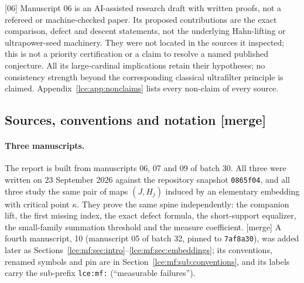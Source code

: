 \documentclass[11pt,letterpaper]{article}
\numberwithin{equation}{section}
\theoremstyle{definition}
\theoremstyle{remark}
\newcommand{\src}[1]{\textup{\textsf{\small[#1]}}}%
\newcommand{\mergetag}{\textup{\textsf{\small[merge]}}}%
\begin{document}
\src{06} Manuscript 06 is an AI-assisted research draft with written proofs,
not a refereed or machine-checked paper. Its proposed contributions are the
exact comparison, defect and descent statements, not the underlying
Hahn-lifting or ultrapower-seed machinery. They were not located in the
sources it inspected; this is not a priority certification or a claim to
resolve a named published conjecture. All its large-cardinal implications
retain their hypotheses; no consistency strength beyond the corresponding
classical ultrafilter principle is claimed. Appendix~\ref{lce:app:nonclaims}
lists every non-claim of every source.

\subsection{Sources, conventions and notation \mergetag}
\label{lce:sec:conventions}

\paragraph{Three manuscripts.} The report is built from manuscripts 06, 07
and 09 of batch 30. All three were written on 23 September 2026 against the
repository snapshot \texttt{0865f04}, and all three study the same pair of
maps $(J,H_j)$ induced by an elementary embedding with critical point
$\kappa$. They prove the same spine independently: the companion lift, the
first missing index, the exact defect formula, the short-support equalizer,
the small-family summation threshold and the measure coefficient.
\mergetag{} A fourth manuscript, 10 (manuscript 05 of batch 32, pinned to
\texttt{7af8a30}), was added later as
Sections~\ref{lce:mf:sec:intro}--\ref{lce:mf:sec:embeddings}; its
conventions, renamed symbols and pin are in
Section~\ref{lce:mf:sub:conventions}, and its labels carry the sub-prefix
\texttt{lce:mf:} (``measurable failures'').
\end{document}
